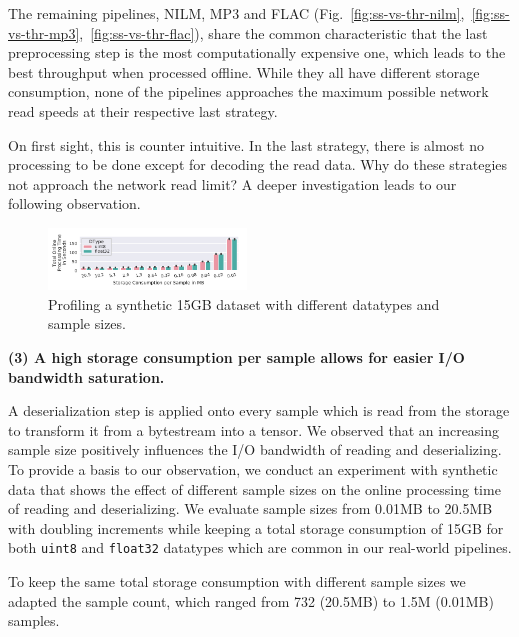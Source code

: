 {\color{diff}
The remaining pipelines, NILM, MP3 and FLAC (Fig.~\ref{fig:ss-vs-thr-nilm},~\ref{fig:ss-vs-thr-mp3},~\ref{fig:ss-vs-thr-flac}), share the common characteristic that the last preprocessing step is the most computationally expensive one, which leads to the best throughput when processed offline.
While they all have different storage consumption, none of the pipelines approaches the maximum possible network read speeds at their respective last strategy.

On first sight, this is counter intuitive.
In the last strategy, there is almost no processing to be done except for decoding the read data.
Why do these strategies not approach the network read limit?
A deeper investigation leads to our following observation.

\vspace{-0.47cm}
\begin{figure}[h]
    \centering
    \includegraphics[width=0.47\textwidth]{figures/misc/artificial-dataset}
    \vspace{-14pt}
    \caption{{\color{diff}Profiling a synthetic 15\:GB dataset with different datatypes and sample sizes.}}
    \label{fig:synthetic-dataset}
\end{figure}
\vspace{-0.3cm}

\textbf{(3) A high storage consumption per sample allows for easier I/O bandwidth saturation.}

A deserialization step is applied onto every sample which is read from the storage to transform it from a bytestream into a tensor.
We observed that an increasing sample size positively influences the I/O bandwidth of reading and deserializing.
To provide a basis to our observation, we conduct an experiment with synthetic data that shows the effect of different sample sizes on the online processing time of reading and deserializing.
We evaluate sample sizes from 0.01\:MB to 20.5\:MB with doubling increments while keeping a total storage consumption of 15\:GB for both \texttt{uint8} and \texttt{float32} datatypes which are common in our real-world pipelines.
}
{\color{diff3}
To keep the same total storage consumption with different sample sizes we adapted the sample count, which ranged from 732 (20.5\:MB) to 1.5M (0.01\:MB) samples.
}
